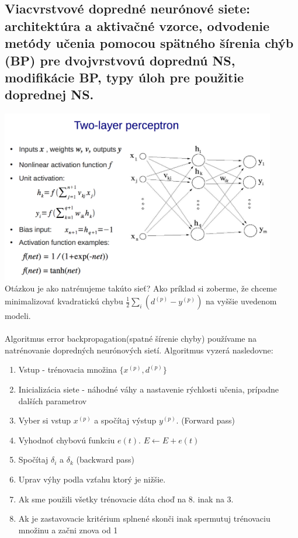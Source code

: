 \documentclass{article}
\numberwithin{equation}{section} %
\begin{document}
\subsection{Viacvrstvové dopredné neurónové siete: architektúra a aktivačné vzorce, odvodenie metódy učenia pomocou spätného šírenia chýb (BP) pre dvojvrstvovú doprednú NS, modifikácie BP, typy úloh pre použitie doprednej NS.}
\includegraphics[width=12cm]{imgs/2Lmlp}\\
Otázkou je ako natrénujeme takúto sieť? Ako príklad si zoberme, že chceme minimalizovať kvadratickú chybu $\frac{1}{2}\sum_i(d^{(p)} - y^{(p)})$ na vyššie uvedenom modeli. 
\\\\
Algoritmus error backpropagation(spatné šírenie chyby) používame na natrénovanie dopredných neurónových sietí. Algoritmus vyzerá nasledovne:\\
\begin{enumerate}
\item Vstup - trénovacia množina $\{x^{(p)}, d^{(p)}\}$
\item Inicializácia siete - náhodné váhy a nastavenie rýchlosti učenia, prípadne dalších parametrov
\item Vyber si vstup $x^{(p)}$ a spočítaj výstup $y^{(p)}$. (Forward pass)
\item Vyhodnoť chybovú funkciu $e(t)$.  $E \leftarrow E + e(t)$
\item Spočítaj $\delta_i$ a $\delta_k$ (backward pass)
\item Uprav výhy podla vzťahu ktorý je nižšie.
\item Ak sme použili všetky trénovacie dáta choď na 8. inak na 3.
\item Ak je zastavovacie kritérium splnené	skonči inak spermutuj trénovaciu množinu a začni znova od 1
\end{enumerate}
\end{document}
